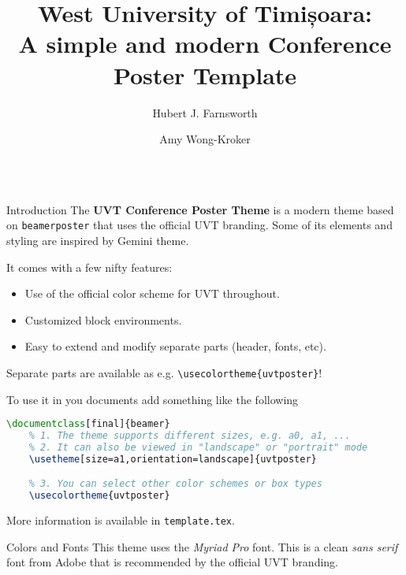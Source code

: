 \documentclass[final]{beamer}
\title{West University of Timișoara: \\ A simple and modern Conference Poster Template}
\author{Hubert J. Farnsworth\inst{1} \and Amy Wong-Kroker\inst{2}}
\institute[shortinst]{\inst{1} West University of Timișoara \quad \inst{2} Mars University}
\begin{document}
\begin{frame}[fragile]
\begin{columns}[t]

\separatorcolumn
\begin{column}{0.3\paperwidth}

\begin{block}{Introduction}
    The \textbf{UVT Conference Poster Theme} is a modern theme based on
    \texttt{beamerposter} that uses the official
    \textcolor{UVTLightBlue}{UVT branding}\footnotemark[1]. Some
    of its elements and styling are inspired by \textcolor{UVTLightBlue}{Gemini}
    theme\footnotemark[2].

    \bigskip
    It comes with a few nifty features:
    \begin{itemize}
        \item Use of the official color scheme for UVT throughout.
        \item Customized block environments.
        \item Easy to extend and modify separate parts (header, fonts, etc).
    \end{itemize}

    \bigskip
    Separate parts are available as e.g. \texttt{\textbackslash usecolortheme\{uvtposter\}}!
    \bigskip

    To use it in you documents add something like the following

    \begin{center}
    \begin{lstlisting}[language=TeX]
    \documentclass[final]{beamer}
    % 1. The theme supports different sizes, e.g. a0, a1, ...
    % 2. It can also be viewed in "landscape" or "portrait" mode
    \usetheme[size=a1,orientation=landscape]{uvtposter}

    % 3. You can select other color schemes or box types
    \usecolortheme{uvtposter}
    \end{lstlisting}
    \end{center}

    \bigskip
    More information is available in \texttt{template.tex}.
    \bigskip

\end{block}

\begin{block}{Colors and Fonts}
    This theme uses the \emph{Myriad Pro} font. This is a clean \emph{sans serif}
    font from Adobe that is recommended by the official UVT branding.


\end{block}
\end{column}
\end{columns}
\end{frame}
\end{document}
